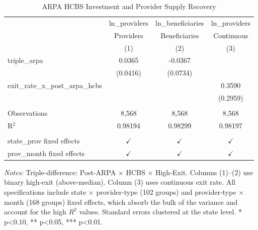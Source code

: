 
\begin{table}[htbp]
   \caption{\label{tab:ddd} ARPA HCBS Investment and Provider Supply Recovery}
   \bigskip
   \centering
   \begin{tabular}{lccc}
      \toprule
                                           & ln\_providers  & ln\_beneficiaries  & ln\_providers\\   
                                           & Providers      & Beneficiaries      & Continuous \\   
                                           & (1)            & (2)                & (3)\\  
      \midrule 
      triple\_arpa                         & 0.0365         & -0.0367            &   \\   
                                           & (0.0416)       & (0.0734)           &   \\   
      exit\_rate\_x\_post\_arpa\_hcbs      &                &                    & 0.3590\\   
                                           &                &                    & (0.2959)\\   
       \\
      Observations                         & 8,568          & 8,568              & 8,568\\  
      R$^2$                                & 0.98194        & 0.98299            & 0.98197\\  
       \\
      state\_prov fixed effects            & $\checkmark$   & $\checkmark$       & $\checkmark$\\   
      prov\_month fixed effects            & $\checkmark$   & $\checkmark$       & $\checkmark$\\   
      \bottomrule
   \end{tabular}
   
   \par \raggedright 
   \textit{Notes:} Triple-difference: Post-ARPA $\times$ HCBS $\times$ High-Exit. Columns (1)--(2) use binary high-exit (above-median). Column (3) uses continuous exit rate. All specifications include state $\times$ provider-type (102 groups) and provider-type $\times$ month (168 groups) fixed effects, which absorb the bulk of the variance and account for the high $R^2$ values. Standard errors clustered at the state level. * p<0.10, ** p<0.05, *** p<0.01.
\end{table}


